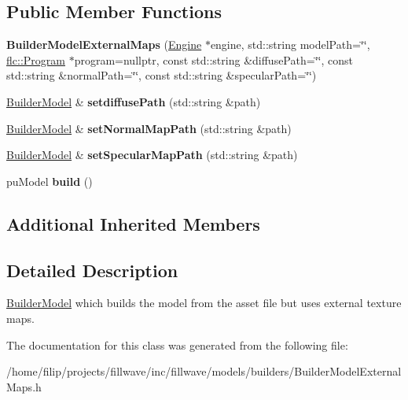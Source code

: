 \subsection*{Public Member Functions}
\begin{DoxyCompactItemize}
\item 
\mbox{\label{classflw_1_1flf_1_1BuilderModelExternalMaps_ac6426366eb916d358c29949fc50bdc87}} 
{\bfseries Builder\+Model\+External\+Maps} (\hyperlink{classflw_1_1Engine}{Engine} $\ast$engine, std\+::string model\+Path=\char`\"{}\char`\"{}, \hyperlink{classflw_1_1flc_1_1Program}{flc\+::\+Program} $\ast$program=nullptr, const std\+::string \&diffuse\+Path=\char`\"{}\char`\"{}, const std\+::string \&normal\+Path=\char`\"{}\char`\"{}, const std\+::string \&specular\+Path=\char`\"{}\char`\"{})
\item 
\mbox{\label{classflw_1_1flf_1_1BuilderModelExternalMaps_aca37eea934334c1148447fc6b90cc059}} 
\hyperlink{classflw_1_1flf_1_1BuilderModel}{Builder\+Model} \& {\bfseries setdiffuse\+Path} (std\+::string \&path)
\item 
\mbox{\label{classflw_1_1flf_1_1BuilderModelExternalMaps_a7f2aaf60ece974f81a3457779c9285c9}} 
\hyperlink{classflw_1_1flf_1_1BuilderModel}{Builder\+Model} \& {\bfseries set\+Normal\+Map\+Path} (std\+::string \&path)
\item 
\mbox{\label{classflw_1_1flf_1_1BuilderModelExternalMaps_ae55c925549e30f8161c4e4dfea45a1c2}} 
\hyperlink{classflw_1_1flf_1_1BuilderModel}{Builder\+Model} \& {\bfseries set\+Specular\+Map\+Path} (std\+::string \&path)
\item 
\mbox{\label{classflw_1_1flf_1_1BuilderModelExternalMaps_a99bccf5d995445e7eb423571f9611e25}} 
pu\+Model {\bfseries build} ()
\end{DoxyCompactItemize}
\subsection*{Additional Inherited Members}


\subsection{Detailed Description}
\hyperlink{classflw_1_1flf_1_1BuilderModel}{Builder\+Model} which builds the model from the asset file but uses external texture maps. 

The documentation for this class was generated from the following file\+:\begin{DoxyCompactItemize}
\item 
/home/filip/projects/fillwave/inc/fillwave/models/builders/Builder\+Model\+External\+Maps.\+h\end{DoxyCompactItemize}
